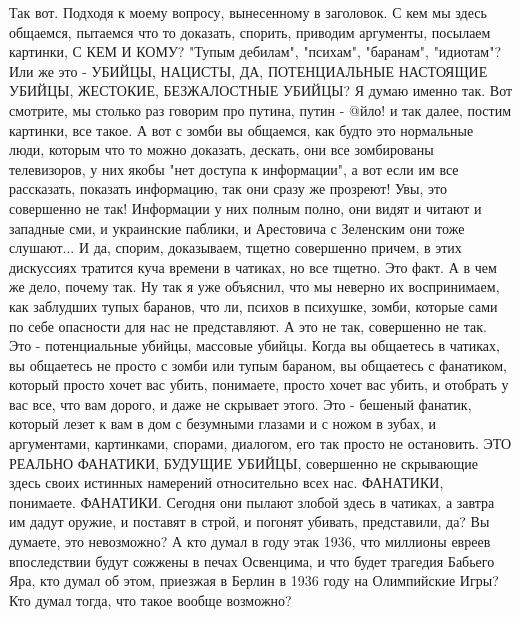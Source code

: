 Так вот. Подходя к моему вопросу, вынесенному в заголовок. С кем мы здесь
общаемся, пытаемся что то доказать, спорить, приводим аргументы, посылаем
картинки, С КЕМ И КОМУ?  "Тупым дебилам", "психам", "баранам", "идиотам"? Или
же это - УБИЙЦЫ, НАЦИСТЫ, ДА, ПОТЕНЦИАЛЬНЫЕ НАСТОЯЩИЕ УБИЙЦЫ, ЖЕСТОКИЕ,
БЕЗЖАЛОСТНЫЕ УБИЙЦЫ? Я думаю именно так. Вот смотрите, мы столько раз говорим
про путина, путин - @йло! и так далее, постим картинки, все такое. А вот с
зомби вы общаемся, как будто это нормальные люди, которым что то можно
доказать, дескать, они все зомбированы телевизоров, у них якобы "нет доступа к
информации", а вот если им все рассказать, показать информацию, так они сразу
же прозреют! Увы, это совершенно не так!  Информации у них полным полно, они
видят и читают и западные сми, и украинские паблики, и Арестовича с Зеленским
они тоже слушают...  И да, спорим, доказываем, тщетно совершенно причем, в этих
дискуссиях тратится куча времени в чатиках, но все тщетно.  Это факт. А в чем
же дело, почему так. Ну так я уже объяснил, что мы неверно их воспринимаем, как
заблудших тупых баранов, что ли, психов в психушке, зомби, которые сами по себе
опасности для нас не представляют. А это не так, совершенно не так.  Это -
потенциальные убийцы, массовые убийцы. Когда вы общаетесь в чатиках, вы
общаетесь не просто с зомби или тупым бараном, вы общаетесь с фанатиком,
который просто хочет вас убить, понимаете, просто хочет вас убить, и отобрать у
вас все, что вам дорого, и даже не скрывает этого.  Это - бешеный фанатик,
который лезет к вам в дом с безумными глазами и с ножом в зубах, и аргументами,
картинками, спорами, диалогом, его так просто не остановить. ЭТО РЕАЛЬНО
ФАНАТИКИ, БУДУЩИЕ УБИЙЦЫ, совершенно не скрывающие здесь своих истинных
намерений относительно всех нас. ФАНАТИКИ, понимаете. ФАНАТИКИ. Сегодня они
пылают злобой здесь в чатиках, а завтра им дадут оружие, и поставят в строй, и
погонят убивать, представили, да? Вы думаете, это невозможно?  А кто думал в
году этак 1936, что миллионы евреев впоследствии будут сожжены в печах
Освенцима, и что будет трагедия Бабьего Яра, кто думал об этом, приезжая в
Берлин в 1936 году на Олимпийские Игры? Кто думал тогда, что такое вообще
возможно?
